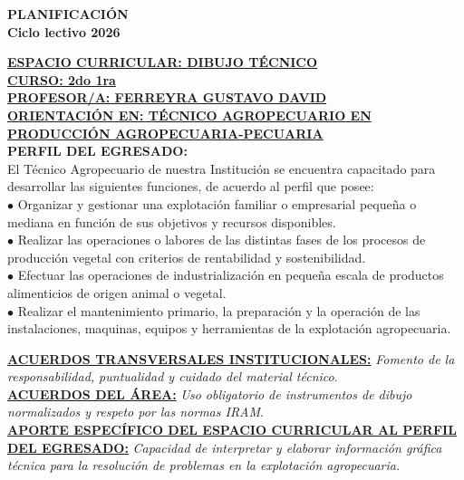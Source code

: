 \documentclass[a4paper,landscape]{article}
\begin{document}
\begin{center}
  \fontsize{12pt}{14pt}\selectfont\bfseries PLANIFICACIÓN \\
  Ciclo lectivo 2026
\end{center}

\vspace{0.5cm}
\noindent\fontsize{11pt}{13pt}\selectfont\textbf{\underline{ESPACIO
CURRICULAR: DIBUJO TÉCNICO}}\\
\noindent\fontsize{11pt}{13pt}\selectfont\textbf{\underline{CURSO: 2do 1ra}}\\
\noindent\fontsize{11pt}{13pt}\selectfont\textbf{\underline{PROFESOR/A:
FERREYRA GUSTAVO DAVID}}\\
\noindent\fontsize{11pt}{13pt}\selectfont\textbf{\underline{ORIENTACIÓN
EN: TÉCNICO AGROPECUARIO EN PRODUCCIÓN AGROPECUARIA-PECUARIA}} \\

\vspace{0.5cm}
\noindent\textbf{PERFIL DEL EGRESADO:}\\
\fontsize{10pt}{12pt}\selectfont El Técnico Agropecuario de nuestra
Institución se encuentra capacitado para desarrollar las siguientes
funciones, de acuerdo al perfil que posee: \\
$\bullet$ Organizar y gestionar una explotación familiar o
empresarial pequeña o mediana en función de sus objetivos y recursos
disponibles.\\ $\bullet$ Realizar las operaciones o labores de las
distintas fases de los procesos de producción vegetal con criterios
de rentabilidad y sostenibilidad.\\ $\bullet$ Efectuar las
operaciones de industrialización en pequeña escala de productos
alimenticios de origen animal o vegetal.\\ $\bullet$ Realizar el
mantenimiento primario, la preparación y la operación de las
instalaciones, maquinas, equipos y herramientas de la explotación agropecuaria.

\vspace{0.3cm}
\noindent\textbf{\underline{ACUERDOS TRANSVERSALES INSTITUCIONALES:}}
\textit{Fomento de la responsabilidad, puntualidad y cuidado del
material técnico}.\\
\noindent\textbf{\underline{ACUERDOS DEL ÁREA:}} \textit{Uso
  obligatorio de instrumentos de dibujo normalizados y respeto por las
normas IRAM}.\\
\noindent\textbf{\underline{APORTE ESPECÍFICO DEL ESPACIO CURRICULAR
AL PERFIL DEL EGRESADO:}} \textit{Capacidad de interpretar y elaborar
  información gráfica técnica para la resolución de problemas en la
explotación agropecuaria.}
\end{document}
